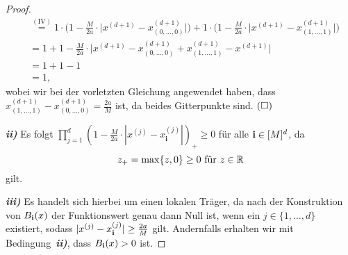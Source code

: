 \begin{proof}
\begin{equation*}
\begin{split}
& \stackrel{(\text{IV})}{=} 1 \cdot \bigg(1 - \frac{M}{2a} \cdot \Big|x^{(d + 1)} - x_{(0,\dots,0)}^{(d + 1)}\Big|\bigg) + 1 \cdot \bigg(1 - \frac{M}{2a} \cdot \Big|x^{(d + 1)} - x_{(1,\dots,1)}^{(d + 1)}\Big|\bigg) \\
& = 1 + 1 - \frac{M}{2a} \cdot \Big|x^{(d + 1)} - x_{(0,\dots,0)}^{(d + 1)} + x_{(1,\dots,1)}^{(d + 1)} - x^{(d + 1)}\Big| \\
& = 1 + 1 - 1 \\
& = 1,
\end{split}
\end{equation*}
wobei wir bei der vorletzten Gleichung angewendet haben, dass $x_{(1,\dots,1)}^{(d + 1)} - x_{(0,\dots,0)}^{(d + 1)} = \frac{2a}{M}$ ist, da beides Gitterpunkte sind.  $\hfill(\square)$ 		

\emph{\textbf{ii)}} Es folgt $\prod_{j = 1}^d (1 - \frac{M}{2a} \cdot |x^{(j)} - x_{\mathbf{i}}^{(j)}|)_+ \geq 0$ für alle $\mathbf{i} \in [M]^d$, da $$z_+= \max\{z, 0\} \geq 0 \text{ für $z \in \mathbb{R}$}$$ gilt.

\emph{\textbf{iii)}} Es handelt sich hierbei um einen lokalen Träger, da nach der Konstruktion von $B_{\mathbf{i}}(x)$ der Funktionswert genau dann Null ist, wenn ein $j \in \{1,\dots, d\}$ existiert, sodass $|x^{(j)} - x_{\mathbf{i}}^{(j)}| \geq \frac{2a}{M}$ gilt. Andernfalls erhalten wir mit Bedingung~\emph{\textbf{ii)}}, dass $B_{\mathbf{i}}(x) > 0$ ist. 
\end{proof}

